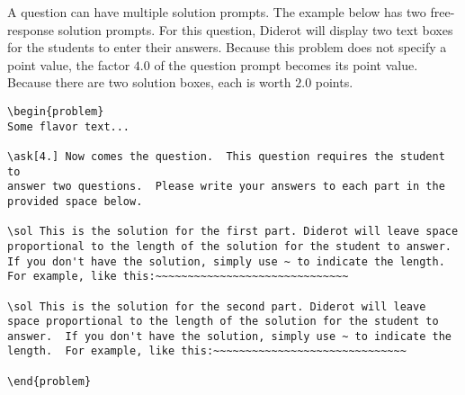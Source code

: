 \begin{cluster}
\label{grp:xmpl:quiz::free-response-with-a-multiple-solutions}

\begin{example}
\label{xmpl:quiz::free-response-with-a-multiple-solutions}
A question can have multiple solution prompts.  The example below has
two free-response solution prompts. For this question, Diderot will
display two text boxes for the students to enter their answers.
Because this problem does not specify a point value, the factor $4.0$
of the question prompt becomes its point value.
Because there are two solution boxes, each is worth $2.0$ points.

\begin{lstlisting}
\begin{problem}
Some flavor text...

\ask[4.] Now comes the question.  This question requires the student to
answer two questions.  Please write your answers to each part in the
provided space below.

\sol This is the solution for the first part. Diderot will leave space
proportional to the length of the solution for the student to answer.
If you don't have the solution, simply use ~ to indicate the length.
For example, like this:~~~~~~~~~~~~~~~~~~~~~~~~~~~~~~

\sol This is the solution for the second part. Diderot will leave
space proportional to the length of the solution for the student to
answer.  If you don't have the solution, simply use ~ to indicate the
length.  For example, like this:~~~~~~~~~~~~~~~~~~~~~~~~~~~~~~

\end{problem}
\end{lstlisting}

\end{example}
\end{cluster}

